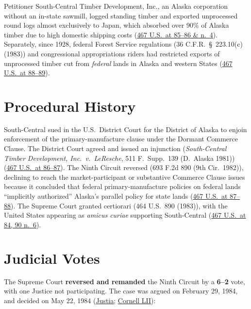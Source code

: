 \documentclass[12pt]{article}
\begin{document}
Petitioner South-Central Timber Development, Inc., an Alaska corporation without an in-state sawmill, logged standing timber and exported unprocessed round logs almost exclusively to Japan, which absorbed over 90\% of Alaska timber due to high domestic shipping costs (\href{https://supreme.justia.com/cases/federal/us/467/82/}{467 U.S.\ at 85--86 \& n.\ 4}). Separately, since 1928, federal Forest Service regulations (36 C.F.R.\ \S\ 223.10(c) (1983)) and congressional appropriations riders had restricted exports of unprocessed timber cut from \emph{federal} lands in Alaska and western States (\href{https://supreme.justia.com/cases/federal/us/467/82/}{467 U.S.\ at 88--89}).

\section{Procedural History}
South-Central sued in the U.S.\ District Court for the District of Alaska to enjoin enforcement of the primary-manufacture clause under the Dormant Commerce Clause. The District Court agreed and issued an injunction (\textit{South-Central Timber Development, Inc.\ v.\ LeResche}, 511 F.\ Supp.\ 139 (D.\ Alaska 1981)) (\href{https://supreme.justia.com/cases/federal/us/467/82/}{467 U.S.\ at 86--87}). The Ninth Circuit reversed (693 F.2d 890 (9th Cir.\ 1982)), declining to reach the market-participant or substantive Commerce Clause issues because it concluded that federal primary-manufacture policies on federal lands ``implicitly authorized'' Alaska's parallel policy for state lands (\href{https://supreme.justia.com/cases/federal/us/467/82/}{467 U.S.\ at 87--88}). The Supreme Court granted certiorari (464 U.S.\ 890 (1983)), with the United States appearing as \textit{amicus curiae} supporting South-Central (\href{https://supreme.justia.com/cases/federal/us/467/82/}{467 U.S.\ at 84, 90 n.\ 6}).

\section{Judicial Votes}
The Supreme Court \textbf{reversed and remanded} the Ninth Circuit by a \textbf{6--2} vote, with one Justice not participating. The case was argued on February 29, 1984, and decided on May 22, 1984 (\href{https://supreme.justia.com/cases/federal/us/467/82/}{Justia}; \href{https://www.law.cornell.edu/supremecourt/text/467/82}{Cornell LII}):
\end{document}
